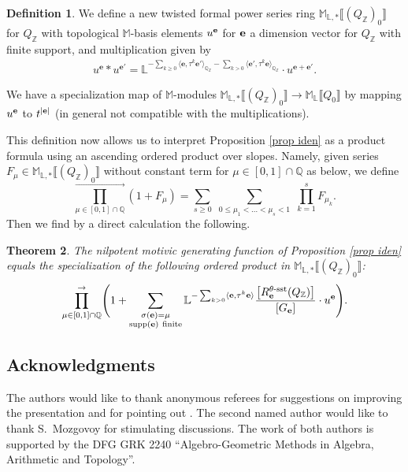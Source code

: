 \documentclass[pdftex]{sigma}
\DeclareMathOperator{\supp}{supp}
\numberwithin{equation}{section}
\newtheorem{Theorem}{Theorem}[section]
\theoremstyle{definition}
\newtheorem{Definition}[Theorem]{Definition}
\begin{document}
\begin{Definition}
We define a new twisted formal power series ring $\mathbb{M}_{\mathbb{L},*}\llbracket(Q_\mathbb{Z})_0\rrbracket$ for $Q_{\mathbb{Z}}$ with topological $\mathbb{M}$-basis elements $u^{\bf e}$ for ${\bf e}$ a dimension vector for $Q_\mathbb{Z}$ with finite support, and multiplication
given by
\begin{align*}
u^{\mathbf{e}} \ast u^{\mathbf{e}'} = \mathbb{L}^{-\sum_{k\geq 0} \langle\mathbf{e}, {\tau}^k \mathbf{e}'\rangle_{\mathbb{Q}_{\mathbb{Z}}} - \sum_{k > 0} \langle\mathbf{e}', {\tau}^k \mathbf{e}\rangle_{\mathbb{Q}_{\mathbb{Z}}}} \cdot u^{\mathbf{e}+\mathbf{e}'} .
\end{align*}

We have a specialization map of $\mathbb{M}$-modules $\mathbb{M}_{\mathbb{L},*}\llbracket(Q_\mathbb{Z})_0\rrbracket\rightarrow \mathbb{M}_\mathbb{L}\llbracket Q_0\rrbracket$ by mapping $u^{\bf e}$ to $t^{|{\bf e}|}$ (in general not compatible with the multiplications).
\end{Definition}
This definition now allows us to interpret Proposition \ref{prop iden} as a product formula using an ascending ordered product over slopes. Namely, given series $F_\mu\in\mathbb{M}_{\mathbb{L},*}\llbracket(Q_\mathbb{Z})_0\rrbracket$ without constant term for $\mu\in[0,1]\cap\mathbb {Q}$ as below, we define
\[\prod_{\mu\in[0,1]\cap\mathbb{Q}}^\rightarrow(1+F_\mu)=\sum_{s\geq 0} \,\, \sum_{0\leq\mu_1<\dots<\mu_s<1}\,\, \prod_{k=1}^sF_{\mu_k}.\]
Then we find by a direct calculation the following.

\begin{Theorem} \label{theoremwcf}
The nilpotent motivic generating function of Proposition {\rm\ref{prop iden}} equals the specialization of the following ordered product in $\mathbb{M}_{\mathbb{L},*}\llbracket(Q_\mathbb{Z})_0\rrbracket$:
\begin{align*}
\prod^{\rightarrow}_{\mu \in [0,1] \cap \mathbb{Q}} \Biggl(1+ \sum\limits_{\substack{\sigma({\bf e})=\mu \\
\supp(\mathbf{e}) \ \mathrm{finite}}} \mathbb{L}^{- \sum_{k>0} \langle\mathbf{e}, {\tau}^k \mathbf{e}\rangle} \frac{\big[R_{\mathbf{e}}^{\theta\text{\rm -sst}} (Q_{\mathbb{Z}})\big]}{[G_{\mathbf{e}}]} \cdot u^{\mathbf{e}} \Biggr) .
\end{align*}
\end{Theorem}

\subsection*{Acknowledgments} The authors would like to thank anonymous referees for suggestions on improving the presentation and for pointing out \cite[Lemma 2.6]{BSV}. The second named author would like to thank S.~Mozgovoy for stimulating discussions. The work of both authors is supported by the DFG GRK 2240 ``Algebro-Geometric Methods in Algebra, Arithmetic and Topology''.
\end{document}
